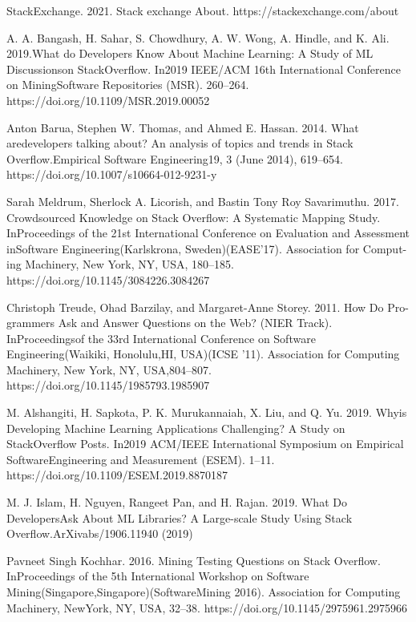\documentclass[conference]{IEEEtran}
\begin{document}
\begin{thebibliography}{00}
 StackExchange. 2021. Stack exchange About. https://stackexchange.com/about

 A. A. Bangash, H. Sahar, S. Chowdhury, A. W. Wong, A. Hindle, and K. Ali. 2019.What do Developers Know About Machine Learning: A Study of ML Discussionson StackOverflow. In2019 IEEE/ACM 16th International Conference on MiningSoftware Repositories (MSR). 260–264.  https://doi.org/10.1109/MSR.2019.00052

 Anton Barua, Stephen W. Thomas, and Ahmed E. Hassan. 2014. What aredevelopers talking about? An analysis of topics and trends in Stack Overflow.Empirical Software Engineering19, 3 (June 2014), 619–654.   https://doi.org/10.1007/s10664-012-9231-y

 Sarah Meldrum, Sherlock A. Licorish, and Bastin Tony Roy Savarimuthu. 2017. Crowdsourced Knowledge on Stack Overflow: A Systematic Mapping Study. InProceedings of the 21st International Conference on Evaluation and Assessment inSoftware Engineering(Karlskrona, Sweden)(EASE’17). Association for Comput-ing Machinery, New York, NY, USA, 180–185. https://doi.org/10.1145/3084226.3084267

 Christoph Treude, Ohad Barzilay, and Margaret-Anne Storey. 2011. How Do Pro-grammers Ask and Answer Questions on the Web? (NIER Track). InProceedingsof the 33rd International Conference on Software Engineering(Waikiki, Honolulu,HI, USA)(ICSE ’11). Association for Computing Machinery, New York, NY, USA,804–807.   https://doi.org/10.1145/1985793.1985907

 M. Alshangiti, H. Sapkota, P. K. Murukannaiah, X. Liu, and Q. Yu. 2019.  Whyis Developing Machine Learning Applications Challenging? A Study on StackOverflow Posts. In2019 ACM/IEEE International Symposium on Empirical SoftwareEngineering and Measurement (ESEM). 1–11.  https://doi.org/10.1109/ESEM.2019.8870187

 M. J. Islam, H. Nguyen, Rangeet Pan, and H. Rajan. 2019. What Do DevelopersAsk About ML Libraries? A Large-scale Study Using Stack Overflow.ArXivabs/1906.11940 (2019)

 Pavneet Singh Kochhar. 2016. Mining Testing Questions on Stack Overflow. InProceedings of the 5th International Workshop on Software Mining(Singapore,Singapore)(SoftwareMining 2016). Association for Computing Machinery, NewYork, NY, USA, 32–38.   https://doi.org/10.1145/2975961.2975966


\end{thebibliography}
\end{document}
